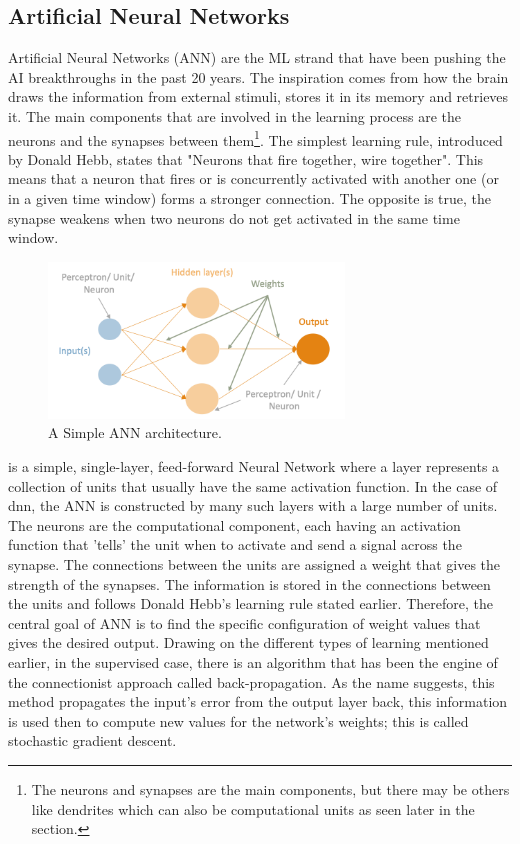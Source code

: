\subsection{Artificial Neural Networks} \label{s:lit:ann_overview}

Artificial Neural Networks (ANN) are the ML strand that have been pushing the AI breakthroughs in the past 20 years. The inspiration comes from how the brain draws the information from external stimuli, stores it in its memory and retrieves it. The main components that are involved in the learning process are the neurons and the synapses between them\footnote{The neurons and synapses are the main components, but there may be others like dendrites which can also be computational units as seen later in the section.}. The simplest learning rule, introduced by Donald Hebb, states that "Neurons that fire together, wire together"\cite{Hebb_Donald1949-nn}. This means that a neuron that fires or is concurrently activated with another one (or in a given time window) forms a stronger connection. The opposite is true, the synapse weakens when two neurons do not get activated in the same time window. 

\begin{figure}[!htb]
  \centering\includegraphics[width=0.7\textwidth,height=0.7\textheight,keepaspectratio]{Sections/Lit_review/Resources/Basic_ANN.png}
    \caption{A Simple ANN architecture. }
    \label{fig:ann_basic}
\end{figure}
\FloatBarrier

 is a simple, single-layer, feed-forward Neural Network where a layer represents a collection of units that usually have the same activation function. In the case of \acrfull{dnn}, the ANN is constructed by many such layers with a large number of units. The neurons are the computational component, each having an activation function that 'tells' the unit when to activate and send a signal across the synapse. The connections between the units are assigned a weight that gives the strength of the synapses. The information is stored in the connections between the units and follows Donald Hebb's learning rule stated earlier. Therefore, the central goal of ANN is to find the specific configuration of weight values that gives the desired output. Drawing on the different types of learning mentioned earlier, in the supervised case, there is an algorithm that has been the engine of the connectionist approach called back-propagation. As the name suggests, this method propagates the input's error from the output layer back, this information is used then to compute new values for the network's weights; this is called stochastic gradient descent.

